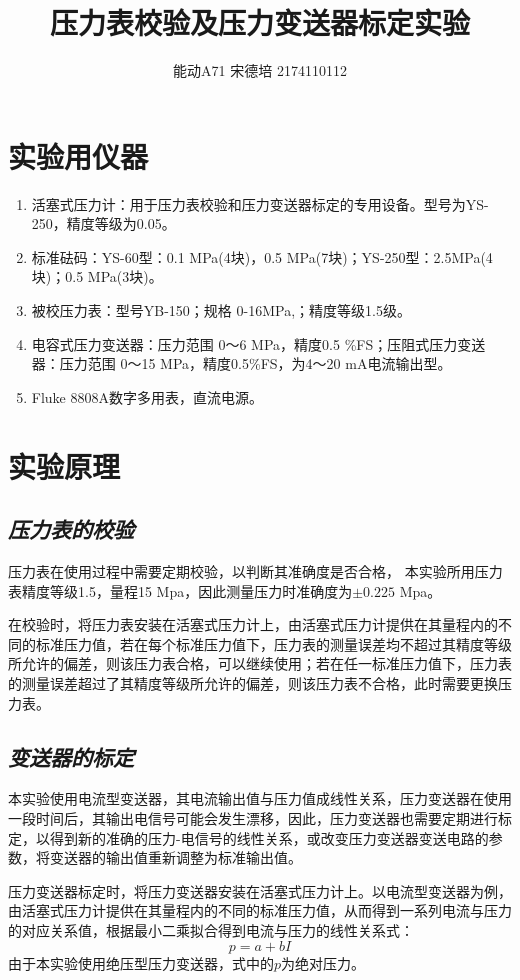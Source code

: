 \documentclass[UTF8]{article}
\title{压力表校验及压力变送器标定实验}
\author{能动A71 宋德培 2174110112}
\begin{document}
	\maketitle
	\section{实验用仪器}
	\begin{enumerate}
	\item	活塞式压力计：用于压力表校验和压力变送器标定的专用设备。型号为YS-250，精度等级为0.05。
	\item 	标准砝码：YS-60型：0.1 MPa(4块)，0.5 MPa(7块)；YS-250型：2.5MPa(4块)；0.5 MPa(3块)。
	\item 	被校压力表：型号YB-150；规格 0-16MPa,；精度等级1.5级。
	\item 	电容式压力变送器：压力范围 0～6 MPa，精度0.5 \%FS；压阻式压力变送器：压力范围 0～15 MPa，精度0.5\%FS，为4～20 mA电流输出型。
	\item 	Fluke 8808A数字多用表，直流电源。
	\end{enumerate}
	
	
	\section{实验原理}
	\subsection{\textit{压力表的校验}}
	压力表在使用过程中需要定期校验，以判断其准确度是否合格，
	本实验所用压力表精度等级1.5，量程15 Mpa，因此测量压力时准确度为$\pm0.225$ Mpa。 
	
	在校验时，将压力表安装在活塞式压力计上，由活塞式压力计提供在其量程内的不同的标准压力值，若在每个标准压力值下，压力表的测量误差均不超过其精度等级所允许的偏差，则该压力表合格，可以继续使用；若在任一标准压力值下，压力表的测量误差超过了其精度等级所允许的偏差，则该压力表不合格，此时需要更换压力表。
	\subsection{\textit{变送器的标定}}
	本实验使用电流型变送器，其电流输出值与压力值成线性关系，压力变送器在使用一段时间后，其输出电信号可能会发生漂移，因此，压力变送器也需要定期进行标定，以得到新的准确的压力-电信号的线性关系，或改变压力变送器变送电路的参数，将变送器的输出值重新调整为标准输出值。
	
	压力变送器标定时，将压力变送器安装在活塞式压力计上。以电流型变送器为例，由活塞式压力计提供在其量程内的不同的标准压力值，从而得到一系列电流与压力的对应关系值，根据最小二乘拟合得到电流与压力的线性关系式：
	\[
	p = a+bI
	\]
	由于本实验使用绝压型压力变送器，式中的$p$为绝对压力。
\end{document}
